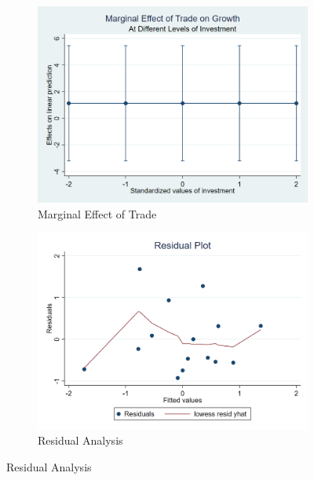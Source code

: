 \documentclass[12pt,a4paper]{article}
\theoremstyle{definition}
\begin{document}
\begin{figure}[H]
\centering
\caption{Non-linear Effects and Interactions}
\begin{subfigure}{.48\textwidth}
\centering
\includegraphics[width=\textwidth]{output/marginal_effects.png}
\caption{Marginal Effect of Trade}
\end{subfigure}
\begin{subfigure}{.48\textwidth}
\centering
\includegraphics[width=\textwidth]{output/residual_plot.png}
\caption{Residual Analysis}
\end{subfigure}
\end{figure}
\end{document}
